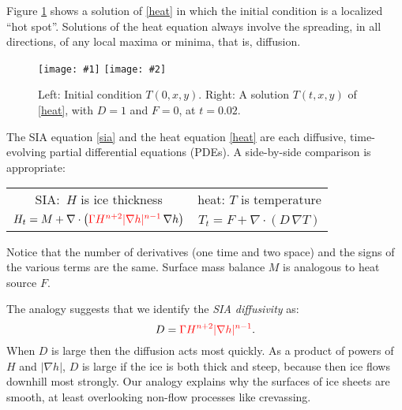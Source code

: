 \documentclass[letterpaper,final,12pt,reqno]{amsart}
\newcommand{\grad}{\nabla}
\newcommand{\Div}{\nabla\cdot}
\newcommand{\twofigsizes}[5]{
\begin{figure}[ht]
\centering
\texttt{[image: \#1]} \quad
\texttt{[image: \#2]}
\caption{#3}
\label{fig:#1}
\end{figure}}
\begin{document}
Figure \ref{fig:initialheat} shows a solution of \eqref{heat} in which the initial condition is a localized ``hot spot''.  Solutions of the heat equation always involve the spreading, in all directions, of any local maxima or minima, that is, diffusion.

\twofigsizes{initialheat}{finalheat}{Left: Initial condition $T(0,x,y)$.   Right: A solution $T(t,x,y)$ of  \eqref{heat}, with $D=1$ and $F=0$, at $t=0.02$.}{2.8in}{2.8in}

The SIA equation \eqref{sia} and the heat equation \eqref{heat} are each diffusive, time-evolving partial differential equations (PDEs).  A side-by-side comparison is appropriate:
\begin{center}
\begin{tabular}{cc}
\vspace{1mm}
SIA:\, $H$ is ice thickness & \phantom{foo bar} heat: $T$ is temperature\phantom{foo bar}  \\
\vspace{1mm}
	$H_t = M + \Div \left({\color{red}\Gamma H^{n+2} |\grad h|^{n-1}}\, \grad h \right)$  &  $T_t = F + \Div (D\, \grad T)$
\end{tabular}
\end{center}
\vspace{1mm}
Notice that the number of derivatives (one time and two space) and the signs of the various terms are the same.  Surface mass balance $M$ is analogous to heat source $F$.

The analogy suggests that we identify the \emph{SIA diffusivity} as:
\begin{equation}
	D = {\color{red}\Gamma H^{n+2} |\grad h|^{n-1}}.  \label{siadiffusivity}
\end{equation}
When $D$ is large then the diffusion acts most quickly.  As a product of powers of $H$ and $|\grad h|$, $D$ is large if the ice is both thick and steep, because then ice flows downhill most strongly.  Our analogy explains why the surfaces of ice sheets are smooth, at least overlooking non-flow processes like crevassing.
\end{document}
